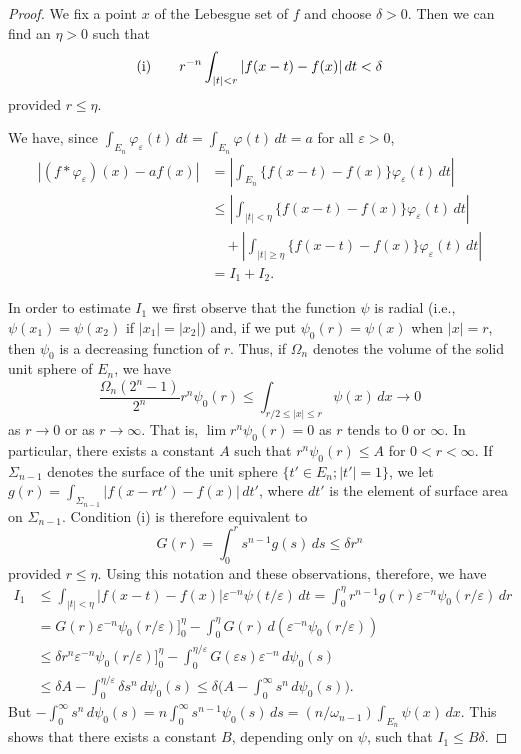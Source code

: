 \begin{proof}
We fix a point $x$ of the Lebesgue set of $f$ and choose $\delta > 0$. Then we
can find an $\eta > 0$ such that
\[
\textup{(i)}\qquad
r^{-n}\int_{|t|<r}|f(x-t)-f(x)|\,dt<\delta
\]
provided $r \leq \eta$.

We have, since $\int_{E_{n}}\varphi_{\varepsilon}(t)\,dt=\int_{E_{n}}\varphi(t)\,dt=a$
for all $\varepsilon>0$,
\begin{align*}
|(f*\varphi_{\varepsilon})(x)-af(x)|
&=\left|\int_{E_{n}}\{f(x-t)-f(x)\}\varphi_{\varepsilon}(t)\,dt\right|\\
&\leq\left|\int_{|t|<\eta}\{f(x-t)-f(x)\}\varphi_{\varepsilon}(t)\,dt\right|\\
&\quad+\left|\int_{|t|\geq\eta}\{f(x-t)-f(x)\}\varphi_{\varepsilon}(t)\,dt\right|\\
&=I_{1}+I_{2}.
\end{align*}

In order to estimate $I_{1}$ we first observe that the function $\psi$ is radial
(i.e., $\psi(x_{1})=\psi(x_{2})$ if $|x_{1}|=|x_{2}|$) and, if we put
$\psi_{0}(r)=\psi(x)$ when $|x|=r$, then $\psi_{0}$ is a decreasing function of
$r$. Thus, if $\Omega_{n}$ denotes the volume of the solid unit sphere of
$E_{n}$, we have
\[
\frac{\Omega_{n}(2^{n}-1)}{2^{n}}r^{n}\psi_{0}(r)\leq\int_{r/2\leq|x|\leq r}\psi(x)\,dx\to0
\]
as $r \to 0$ or as $r \to \infty$. That is, $\lim r^{n} \psi_{0}(r) = 0$ as $r$
tends to $0$ or $\infty$. In particular, there exists a constant $A$ such that
$r^{n} \psi_{0}(r) \leq A$ for $0 < r < \infty$. If $\Sigma_{n-1}$ denotes the
surface of the unit sphere $\{t' \in E_{n}; |t'| = 1\}$, we let
$g(r) = \int_{\Sigma_{n-1}} |f(x - rt') - f(x)| \, dt'$, where $dt'$ is the
element of surface area on $\Sigma_{n-1}$. Condition (i) is therefore equivalent
to
\[
G(r)=\int_{0}^{r}s^{n-1}g(s)\,ds\leq\delta r^{n}
\]
provided $r \leq \eta$. Using this notation and these observations, therefore,
we have
\begin{align*}
I_{1}&\leq\int_{|t|<\eta}|f(x-t)-f(x)|\varepsilon^{-n}\psi(t/\varepsilon)\,dt
=\int_{0}^{\eta}r^{n-1}g(r)\varepsilon^{-n}\psi_{0}(r/\varepsilon)\,dr\\
&=G(r)\varepsilon^{-n}\psi_{0}(r/\varepsilon)\big]_{0}^{\eta}
-\int_{0}^{\eta}G(r)\,d(\varepsilon^{-n}\psi_{0}(r/\varepsilon))\\
&\leq\delta r^{n}\varepsilon^{-n}\psi_{0}(r/\varepsilon)\big]_{0}^{\eta}
-\int_{0}^{\eta/\varepsilon}G(\varepsilon s)\varepsilon^{-n}\,d\psi_{0}(s)\\
&\leq\delta A-\int_{0}^{\eta/\varepsilon}\delta s^{n}\,d\psi_{0}(s)
\leq\delta\Biggl(A-\int_{0}^{\infty}s^{n}\,d\psi_{0}(s)\Biggr).
\end{align*}
But
$-\int_{0}^{\infty}s^{n}\,d\psi_{0}(s)=n\int_{0}^{\infty}s^{n-1}\psi_{0}(s)\,ds=(n/\omega_{n-1})\int_{E_{n}}\psi(x)\,dx$.
This shows that there exists a constant $B$, depending only on $\psi$, such that
$I_{1}\leq B\delta$.


\end{proof}
